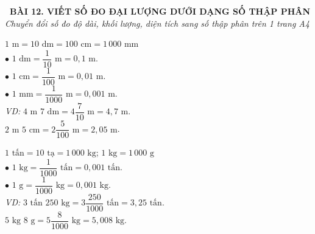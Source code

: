 \documentclass[14pt,a4paper,oneside]{extbook}
\begin{document}
\noindent
\begin{tcolorbox}[
  enhanced,
  colback=teal!8!white,
  colframe=teal!80!black,
  arc=3mm,
  boxrule=1.1pt,
  width=\linewidth,
  halign=center,
  top=2.2mm, bottom=2.2mm,
  left=3mm, right=3mm,
  drop fuzzy shadow
]
  {\large\bfseries\color{teal!95!black}\faBookmark\ BÀI 12. VIẾT SỐ ĐO ĐẠI LƯỢNG DƯỚI DẠNG SỐ THẬP PHÂN}\\[2pt]
  {\scriptsize\color{black!75}\itshape Chuyển đổi số đo độ dài, khối lượng, diện tích sang số thập phân trên 1 trang A4}
\end{tcolorbox}

\vspace{3.2mm}
\noindent
\begin{minipage}[t]{0.50\textwidth}
  \begin{tcolorbox}[
    enhanced,
    title={\footnotesize\bfseries\color{white}\faRuler\ 1. Số đo độ dài (gấp kém 10 lần)},
    colback=blue!2!white,
    colframe=blue!75!black,
    arc=2.5mm, boxrule=0.8pt, top=1.8mm, bottom=1.8mm, left=2.2mm, right=2.2mm
  ]
    \footnotesize
    $1\text{ m} = 10\text{ dm} = 100\text{ cm} = 1\,000\text{ mm}$\\
    $\bullet$ $1\text{ dm} = \dfrac{1}{10}\text{ m} = 0,1\text{ m}$.\\
    $\bullet$ $1\text{ cm} = \dfrac{1}{100}\text{ m} = 0,01\text{ m}$.\\
    $\bullet$ $1\text{ mm} = \dfrac{1}{1000}\text{ m} = 0,001\text{ m}$.\\[2pt]
    \textit{VD:} $4\text{ m } 7\text{ dm} = 4\dfrac{7}{10}\text{ m} = 4,7\text{ m}$.\\
    $2\text{ m } 5\text{ cm} = 2\dfrac{5}{100}\text{ m} = 2,05\text{ m}$.
  \end{tcolorbox}
\end{minipage}%
\hfill
\begin{minipage}[t]{0.48\textwidth}
  \begin{tcolorbox}[
    enhanced,
    title={\footnotesize\bfseries\color{white}\faBalanceScale\ 2. Số đo khối lượng (gấp kém 10 lần)},
    colback=teal!2!white,
    colframe=teal!75!black,
    arc=2.5mm, boxrule=0.8pt, top=1.8mm, bottom=1.8mm, left=2mm, right=2mm
  ]
    \footnotesize
    $1\text{ tấn} = 10\text{ tạ} = 1\,000\text{ kg}$; $1\text{ kg} = 1\,000\text{ g}$\\
    $\bullet$ $1\text{ kg} = \dfrac{1}{1000}\text{ tấn} = 0,001\text{ tấn}$.\\
    $\bullet$ $1\text{ g} = \dfrac{1}{1000}\text{ kg} = 0,001\text{ kg}$.\\[2pt]
    \textit{VD:} $3\text{ tấn } 250\text{ kg} = 3\dfrac{250}{1000}\text{ tấn} = 3,25\text{ tấn}$.\\
    $5\text{ kg } 8\text{ g} = 5\dfrac{8}{1000}\text{ kg} = 5,008\text{ kg}$.
  \end{tcolorbox}
\end{minipage}
\end{document}
